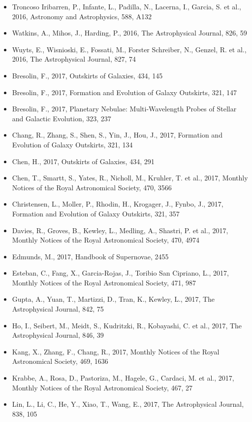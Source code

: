 \documentclass{letter}
\begin{document}
\begin{enumerate}
\begin{itemize}
\item Troncoso Iribarren, P., Infante, L., Padilla, N., Lacerna, I., Garcia, S. et al., 2016, Astronomy and Astrophysics, 588, A132
\item Watkins, A., Mihos, J., Harding, P., 2016, The Astrophysical Journal, 826, 59
\item Wuyts, E., Wisnioski, E., Fossati, M., Forster Schreiber, N., Genzel, R. et al., 2016, The Astrophysical Journal, 827, 74
\item Bresolin, F., 2017, Outskirts of Galaxies, 434, 145
\item Bresolin, F., 2017, Formation and Evolution of Galaxy Outskirts, 321, 147
\item Bresolin, F., 2017, Planetary Nebulae: Multi-Wavelength Probes of Stellar and Galactic Evolution, 323, 237
\item Chang, R., Zhang, S., Shen, S., Yin, J., Hou, J., 2017, Formation and Evolution of Galaxy Outskirts, 321, 134
\item Chen, H., 2017, Outskirts of Galaxies, 434, 291
\item Chen, T., Smartt, S., Yates, R., Nicholl, M., Kruhler, T. et al., 2017, Monthly Notices of the Royal Astronomical Society, 470, 3566
\item Christensen, L., Moller, P., Rhodin, H., Krogager, J., Fynbo, J., 2017, Formation and Evolution of Galaxy Outskirts, 321, 357
\item Davies, R., Groves, B., Kewley, L., Medling, A., Shastri, P. et al., 2017, Monthly Notices of the Royal Astronomical Society, 470, 4974
\item Edmunds, M., 2017, Handbook of Supernovae, 2455
\item Esteban, C., Fang, X., Garcia-Rojas, J., Toribio San Cipriano, L., 2017, Monthly Notices of the Royal Astronomical Society, 471, 987
\item Gupta, A., Yuan, T., Martizzi, D., Tran, K., Kewley, L., 2017, The Astrophysical Journal, 842, 75
\item Ho, I., Seibert, M., Meidt, S., Kudritzki, R., Kobayashi, C. et al., 2017, The Astrophysical Journal, 846, 39
\item Kang, X., Zhang, F., Chang, R., 2017, Monthly Notices of the Royal Astronomical Society, 469, 1636
\item Krabbe, A., Rosa, D., Pastoriza, M., Hagele, G., Cardaci, M. et al., 2017, Monthly Notices of the Royal Astronomical Society, 467, 27
\item Lin, L., Li, C., He, Y., Xiao, T., Wang, E., 2017, The Astrophysical Journal, 838, 105

\end{itemize}
\end{enumerate}
\end{document}
